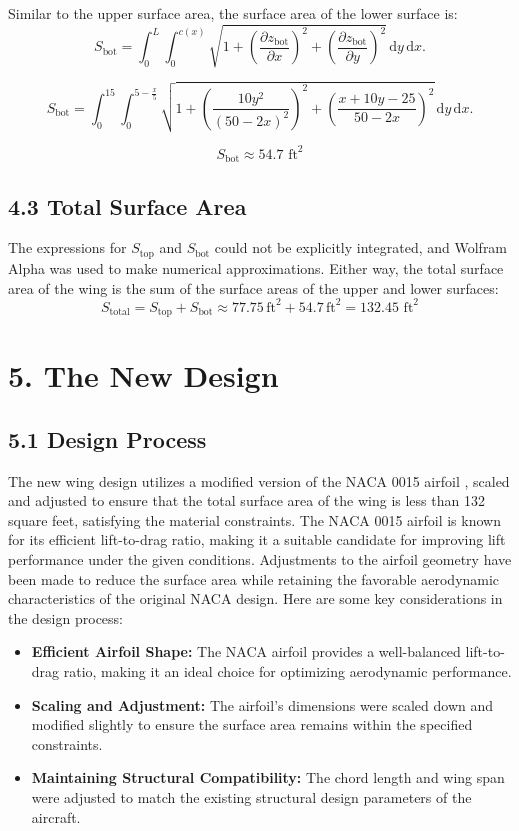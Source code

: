 \documentclass[12pt]{article}
\begin{document}
Similar to the upper surface area, the surface area of the lower surface is:
\[
S_{\text{bot}} = \int_{0}^L \int_{0}^{c(x)} \sqrt{1 + \left( \frac{\partial z_{\text{bot}}}{\partial x} \right)^2 + \left( \frac{\partial z_{\text{bot}}}{\partial y} \right)^2} \, \mathrm{d}y \, \mathrm{d}x.
\]

\[
S_{\text{bot}} = \int_{0}^{15} \int_{0}^{5 - \frac{x}{5}} \sqrt{1 + \left( \frac{10y^2}{(50-2x)^2} \right)^2 + \left( \frac{x + 10y - 25}{50 - 2x} \right)^2} \, \mathrm{d}y \, \mathrm{d}x.
\]

\[
S_{\text{bot}} \approx 54.7 \text{ ft}^2 \]
\subsection*{4.3 Total Surface Area}
The expressions for $S_{\text{top}}$ and $S_{\text{bot}}$ could not be explicitly integrated, and Wolfram Alpha was used to make numerical approximations. Either way, the total surface area of the wing is the sum of the surface areas of the upper and lower surfaces:
\[
S_{\text{total}} = S_{\text{top}} + S_{\text{bot}} \approx 77.75 \, \text{ft}^2 + 54.7 \, \text{ft}^2 = 132.45 \text{ ft}^2
\]

\section*{5. The New Design}

\subsection*{5.1 Design Process}

The new wing design utilizes a modified version of the NACA 0015 airfoil \cite{airfoil_intro}, scaled and adjusted to ensure that the total surface area of the wing is less than 132 square feet, satisfying the material constraints. The NACA 0015 airfoil is known for its efficient lift-to-drag ratio, making it a suitable candidate for improving lift performance under the given conditions. Adjustments to the airfoil geometry have been made to reduce the surface area while retaining the favorable aerodynamic characteristics of the original NACA design. Here are some key considerations in the design process:
\begin{itemize}
    \item \textbf{Efficient Airfoil Shape:} The NACA airfoil provides a well-balanced lift-to-drag ratio, making it an ideal choice for optimizing aerodynamic performance.
    \item \textbf{Scaling and Adjustment:} The airfoil's dimensions were scaled down and modified slightly to ensure the surface area remains within the specified constraints.
    \item \textbf{Maintaining Structural Compatibility:} The chord length and wing span were adjusted to match the existing structural design parameters of the aircraft.
\end{itemize}
\end{document}
